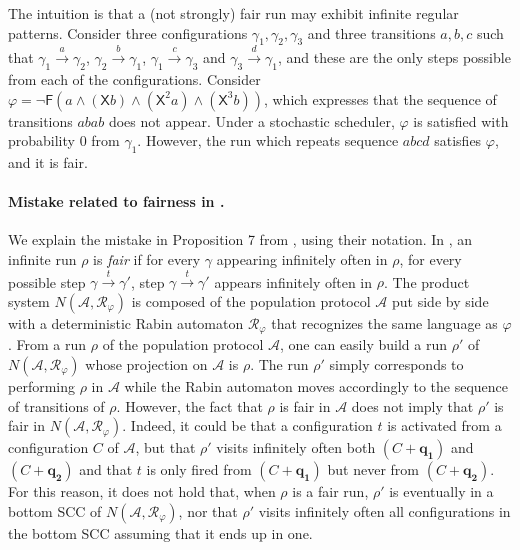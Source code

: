 \documentclass[10pt,a4paper]{article}
\newcommand{\config}{\gamma}
\newcommand{\run}{\rho}
\newcommand{\trans}[1]{\xrightarrow{#1}}       %
\newcommand{\ltlnext}{\mathsf{X}}
\newcommand{\ltlfinally}{\mathsf{F}}
\begin{document}
\begin{example}
\label{ex:fair-vs-strong-fair}
The intuition is that a (not strongly) fair run may exhibit infinite regular patterns.
Consider three configurations \(\config_1,\config_2,\config_3\) and three transitions \(a,b,c\) such that \(\config_1 \trans{a} \config_2\), \(\config_2 \trans{b} \config_1\), \(\config_1 \trans{c} \config_3\) and \(\config_3 \trans{d} \config_1\), and these are the only steps possible from each of the configurations.
%
Consider \(\varphi = \neg \ltlfinally(a \land (\ltlnext b) \land (\ltlnext^2 a) \land (\ltlnext^3 b))\), which expresses that the sequence of transitions \(abab\) does not appear.
Under a stochastic scheduler, \(\varphi\) is satisfied with probability \(0\) from \(\config_1\).
However, the run which repeats sequence \(abcd\) satisfies \(\varphi\), and it is fair.
\end{example}

%
%
%
%

%
\begin{toappendix}
	\paragraph*{Mistake related to fairness in \cite{EGLM16}.}
	We explain the mistake in Proposition 7 from \cite{EGLM16},
	using their notation.
	In \cite{EGLM16}, an infinite run \(\run\) is \emph{fair} if for every \(\config\) appearing infinitely often in \(\run\), for every possible step \(\config \trans{t} \config'\), step \(\config \trans{t} \config'\) appears infinitely often in \(\run\).
	The product system \(N(\mathcal{A}, \mathcal{R}_\varphi)\) is composed of the population protocol \(\mathcal{A}\) put side by side with a deterministic Rabin automaton \(\mathcal{R}_\varphi\) that recognizes the same language as \(\varphi\).
	From a run \(\run\) of the population protocol \(\mathcal{A}\), one can easily build a run \(\run'\) of \(N(\mathcal{A}, \mathcal{R}_\varphi)\) whose projection on \(\mathcal{A}\) is \(\run\).
	The run \(\run'\) simply corresponds to performing \(\run\) in \(\mathcal{A}\) while the Rabin automaton moves accordingly to the sequence of transitions of \(\run\).
	However, the fact that \(\run\) is fair in \(\mathcal{A}\) does not imply that \(\run'\) is fair in \(N(\mathcal{A}, \mathcal{R}_\varphi)\).
	Indeed, it could be that a configuration \(t\) is activated from a configuration \(C\) of \(\mathcal{A}\), but that \(\run'\) visits infinitely often both \((C+\mathbf{q_1})\) and \((C + \mathbf{q_2})\) and that \(t\) is only fired from \((C+\mathbf{q_1})\) but never from \((C + \mathbf{q_2})\).
	For this reason, it does not hold that, when \(\run\) is a fair run, \(\run'\) is eventually in a bottom SCC of \(N(\mathcal{A}, \mathcal{R}_\varphi)\), nor that \(\run'\) visits infinitely often all configurations in the bottom SCC assuming that it ends up in one.
\end{toappendix}
\end{document}
